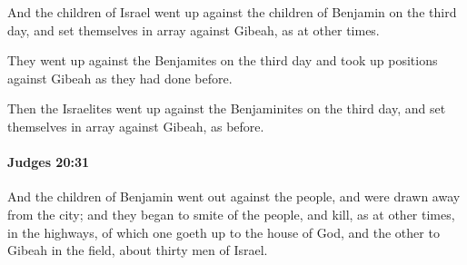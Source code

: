 			\begin{versebox}
					\item[BHS] 
					\item[ASV] And the children of Israel went up against the children of Benjamin on the third day, and set themselves in array against Gibeah, as at other times.
					\item[NIV] They went up against the Benjamites on the third day and took up positions against Gibeah as they had done before.
					\item[NRSV] Then the Israelites went up against the Benjaminites on the third day, and set themselves in array against Gibeah, as before.
			\end{versebox}

		\paragraph{Judges 20:31} %
			\label{JUDGES-20-31}

			And the children of Benjamin went out against the people, and were drawn away from the city; and they began to smite of the people, and kill, as at other times, in the highways, of which one goeth up to the house of God, and the other to Gibeah in the field, about thirty men of Israel.

